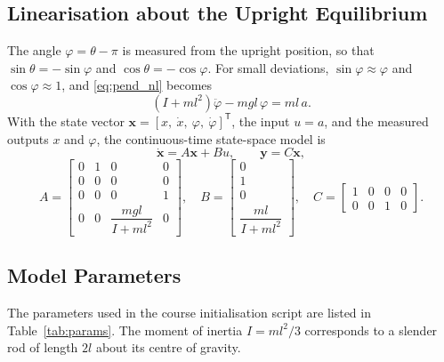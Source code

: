 \subsection{Linearisation about the Upright Equilibrium}
\label{subsec:linear}

The angle $\varphi = \theta - \pi$ is measured from the upright position, so
that $\sin\theta = -\sin\varphi$ and $\cos\theta = -\cos\varphi$. For small
deviations, $\sin\varphi \approx \varphi$ and $\cos\varphi \approx 1$, and
\eqref{eq:pend_nl} becomes~\cite{ln_manual}
\begin{equation}
  \left(I + ml^2\right)\ddot{\varphi} - mgl\,\varphi = ml\,a .
  \label{eq:pend_lin}
\end{equation}
With the state vector $\mathbf{x} = [x,\ \dot{x},\ \varphi,\ \dot{\varphi}]^{\mathsf{T}}$,
the input $u = a$, and the measured outputs $x$ and $\varphi$, the
continuous-time state-space model is
\begin{equation}
  \dot{\mathbf{x}} = A\mathbf{x} + Bu, \qquad \mathbf{y} = C\mathbf{x},
  \label{eq:ss}
\end{equation}
\begin{equation}
  A = \begin{bmatrix}
        0 & 1 & 0 & 0\\
        0 & 0 & 0 & 0\\
        0 & 0 & 0 & 1\\
        0 & 0 & \dfrac{mgl}{I+ml^2} & 0
      \end{bmatrix}, \quad
  B = \begin{bmatrix} 0\\ 1\\ 0\\ \dfrac{ml}{I+ml^2} \end{bmatrix}, \quad
  C = \begin{bmatrix} 1 & 0 & 0 & 0\\ 0 & 0 & 1 & 0 \end{bmatrix}.
  \label{eq:ABC}
\end{equation}

\subsection{Model Parameters}
\label{subsec:params}

The parameters used in the course initialisation script are listed in
Table~\ref{tab:params}. The moment of inertia $I = ml^2/3$ corresponds to a
slender rod of length $2l$ about its centre of gravity.


